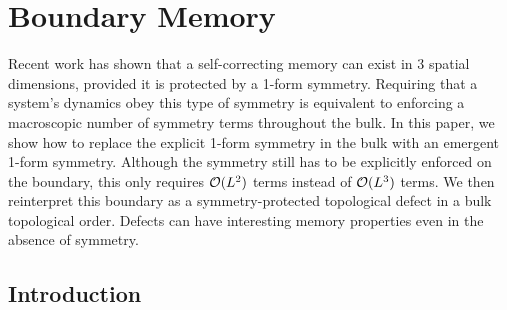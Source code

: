 
%
%
%
%	
%	

\chapter{Boundary Memory} \label{chp:boundary}
	
	
Recent work has shown that a self-correcting memory can exist in 3 spatial dimensions, provided it is protected by a 1-form symmetry. Requiring that a system's dynamics obey this type of symmetry is equivalent to enforcing a macroscopic number of symmetry terms throughout the bulk. In this paper, we show how to replace the explicit 1-form symmetry in the bulk with an emergent 1-form symmetry. Although the symmetry still has to be explicitly enforced on the boundary, this only requires $\cal{O}(L^2)$ terms instead of $\cal{O}(L^3)$ terms. We then reinterpret this boundary as a symmetry-protected topological defect in a bulk topological order. Defects can have interesting memory properties even in the absence of symmetry.



\section{Introduction} \label{sec:intro}

